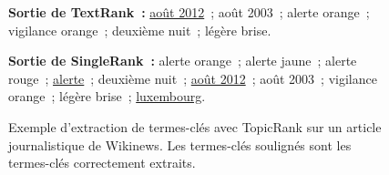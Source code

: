 \begin{figure}
{{      \textbf{Sortie de TextRank~:} \underline{août 2012}~; août 2003~; alerte
      orange~; vigilance orange~; deuxième nuit~; légère brise.

      \textbf{Sortie de SingleRank~:} alerte orange~; alerte jaune~; alerte
      rouge~; \underline{alerte}~; deuxième nuit~; \underline{août 2012}~; août
      2003~; vigilance orange~; légère brise~; \underline{luxembourg}.
    }
  }

  \caption[
    Exemple d'extraction de termes-clés avec TopicRank sur un article
    journalistique de Wikinews
  ]{
    Exemple d'extraction de termes-clés avec TopicRank sur un article
    journalistique de Wikinews. Les termes-clés soulignés sont les
    termes-clés correctement extraits.
    \label{fig:exemple_topicrank}
  }
\end{figure}

